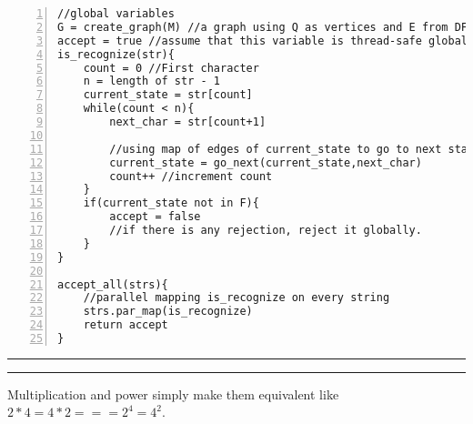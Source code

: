 \documentclass[a4paper, 11pt]{article}
\newcommand{\question}[2] {\vspace{.25in} \hrule\vspace{0.5em}
	\noindent{\bf #1: #2} \vspace{0.5em}
	\hrule \vspace{.10in}}
\begin{document}
\begin{Verbatim}[numbers=left]
//global variables
G = create_graph(M) //a graph using Q as vertices and E from DFA
accept = true //assume that this variable is thread-safe globally
is_recognize(str){
	count = 0 //First character
	n = length of str - 1
	current_state = str[count]
	while(count < n){
		next_char = str[count+1]
		
		//using map of edges of current_state to go to next state
		current_state = go_next(current_state,next_char)
		count++ //increment count
	}
	if(current_state not in F){
		accept = false 
		//if there is any rejection, reject it globally.
	}
}

accept_all(strs){
	//parallel mapping is_recognize on every string
	strs.par_map(is_recognize)
	return accept
}
\end{Verbatim}

	
	
	\question{6}{All The Same?}
	Multiplication and power simply make them equivalent like $2*4 = 4*2 === 2^4 = 4^2$.
	
\end{document}
